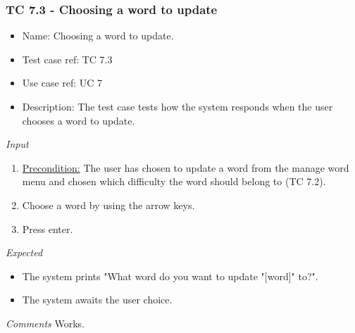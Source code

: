 \documentclass[12pt, letterpaper]{article}
\begin{document}
\subsubsection{TC 7.3 - Choosing a word to update}
\begin{itemize}
	\item Name: Choosing a word to update.
	\item Test case ref: TC 7.3
	\item Use case ref: UC 7
	\item Description: The test case tests how the system responds when the user chooses a word to update.
\end{itemize}
\emph{Input}
\begin{enumerate}
	\item \underline{Precondition:} The user has chosen to update a word from the manage word menu and chosen which difficulty the word should belong to (TC 7.2).
	\item Choose a word by using the arrow keys.
	\item Press enter.
\end{enumerate}
\emph{Expected}
\begin{itemize}
	\item The system prints "What word do you want to update "[word]" to?".
	\item The system awaits the user choice.
\end{itemize}
\begin{Form}
	\newline
	\newline
\end{Form}
\newline
\emph{Comments}
Works.
\end{document}
